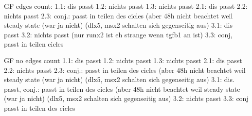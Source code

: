 GF edges count:
1.1: dis passt
1.2: nichts passt
1.3: nichts passt
2.1: dis passt
2.2: nichts passt
2.3: conj.: passt in teilen des cicles (aber 48h nicht beachtet weil steady state (war ja nicht) (dlx5, msx2 schalten sich gegenseitig aus)
3.1: dis passt
3.2: nichts passt (nur runx2 ist eh strange wenn tgfb1 an ist)
3.3: conj, passt in teilen cicles

GF no edges count
1.1: dis passt
1.2: nichts passt
1.3: nichts passt
2.1: dis passt
2.2: nichts passt
2.3: conj.: passt in teilen des cicles (aber 48h nicht beachtet weil steady state (war ja nicht) (dlx5, msx2 schalten sich gegenseitig aus)
3.1: dis. passt, conj.: passt in teilen des cicles (aber 48h nicht beachtet weil steady state (war ja nicht) (dlx5, msx2 schalten sich gegenseitig aus)
3.2: nichts passt
3.3: conj passt in teilen des cicles
